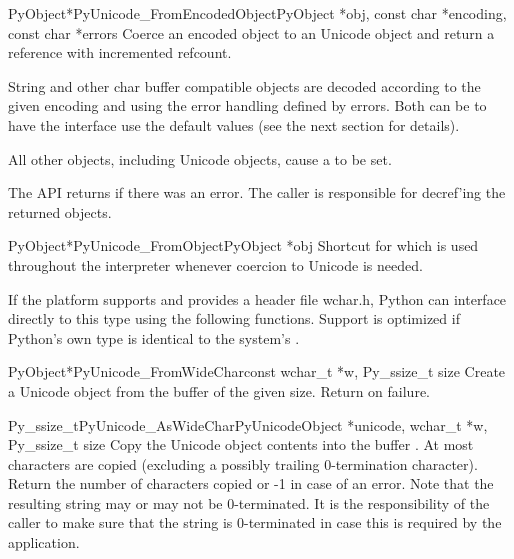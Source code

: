 \begin{cfuncdesc}{PyObject*}{PyUnicode_FromEncodedObject}{PyObject *obj,
                                                      const char *encoding,
                                                      const char *errors}
  Coerce an encoded object  to an Unicode object and return a
  reference with incremented refcount.
  
  String and other char buffer compatible objects are decoded
  according to the given encoding and using the error handling
  defined by errors.  Both can be \NULL{} to have the interface
  use the default values (see the next section for details).

  All other objects, including Unicode objects, cause a
   to be set.

  The API returns \NULL{} if there was an error.  The caller is
  responsible for decref'ing the returned objects.
\end{cfuncdesc}

\begin{cfuncdesc}{PyObject*}{PyUnicode_FromObject}{PyObject *obj}
  Shortcut for 
  which is used throughout the interpreter whenever coercion to
  Unicode is needed.
\end{cfuncdesc}


If the platform supports  and provides a header file
wchar.h, Python can interface directly to this type using the
following functions. Support is optimized if Python's own
 type is identical to the system's .

\begin{cfuncdesc}{PyObject*}{PyUnicode_FromWideChar}{const wchar_t *w,
                                                     Py_ssize_t size}
  Create a Unicode object from the  buffer  of
  the given size.  Return \NULL{} on failure.
\end{cfuncdesc}

\begin{cfuncdesc}{Py_ssize_t}{PyUnicode_AsWideChar}{PyUnicodeObject *unicode,
                                             wchar_t *w,
                                             Py_ssize_t size}
  Copy the Unicode object contents into the  buffer
  .  At most   characters are copied
  (excluding a possibly trailing 0-termination character).  Return
  the number of  characters copied or -1 in case of an
  error.  Note that the resulting  string may or may
  not be 0-terminated.  It is the responsibility of the caller to make
  sure that the  string is 0-terminated in case this is
  required by the application.
\end{cfuncdesc}


